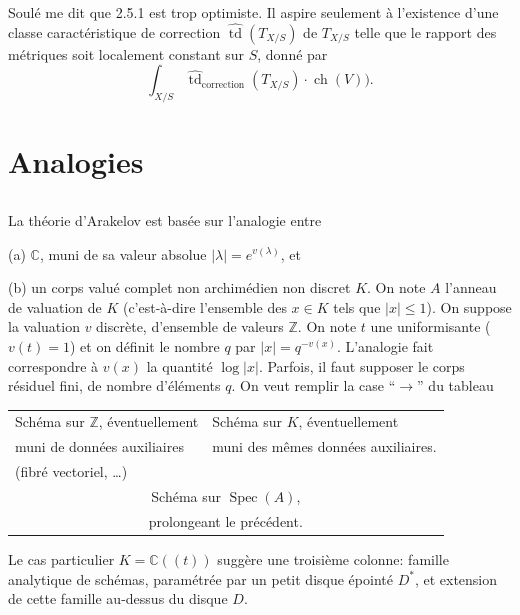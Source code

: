 \documentclass[12pt,a4paper]{article}
\theoremstyle{plain}
\theoremstyle{definition}
\DeclareMathOperator{\ch}{ch}
\DeclareMathOperator{\td}{td}
\DeclareMathOperator{\Spec}{Spec}
\newcommand{\ZZ}{\mathbb{Z}}
\newcommand{\CC}{\mathbb{C}}
\begin{document}
Soul\'e me dit que 2.5.1 est trop optimiste. Il aspire seulement \`a l'existence
d'une classe caract\'eristique de correction $\widehat{\td}(T_{X/S})$ de $T_{X/S}$ telle que le rapport
des m\'etriques soit localement constant sur $S$, donn\'e par
\[
\textstyle \int_{X/S} \widehat{\td}_{\text{correction}}(T_{X/S}) \cdot \ch(V)) .
\]



\section{Analogies}

\subsection{}

La th\'eorie d'Arakelov est bas\'ee sur l'analogie entre

(a) $\CC$, muni de sa valeur absolue $|\lambda| = e^{v(\lambda)}$, et

(b) un corps valu\'e complet non archim\'edien non discret $K$. On note $A$ l'anneau
de valuation de $K$ (c'est-\`a-dire l'ensemble des $x \in K$ tels que $|x| \leq 1$).
On suppose la valuation $v$ discr\`ete, d'ensemble de valeurs $\ZZ$. On note $t$
une uniformisante ($v(t) = 1$) et on d\'efinit le nombre $q$ par $|x| = q^{-v(x)}$.
L'analogie fait correspondre \`a $v(x)$ la quantit\'e $\log |x|$. Parfois, il faut
supposer le corps r\'esiduel fini, de nombre d'\'el\'ements $q$. On veut remplir la
case ``$\to$'' du tableau

\begin{center}
\begin{tabular}{p{6cm}|p{6cm}}
Sch\'ema sur $\ZZ$, \'eventuellement & Sch\'ema sur $K$, \'eventuellement \\
muni de donn\'ees auxiliaires & muni des m\^emes donn\'ees auxiliaires.\\
(fibr\'e vectoriel, \ldots) & \\
\hline
\multicolumn{2}{c}{Sch\'ema sur $\Spec(A)$,} \\
\multicolumn{2}{c}{prolongeant le pr\'ec\'edent.}
\end{tabular}
\end{center}

Le cas particulier $K = \CC((t))$ sugg\`ere une troisi\`eme colonne: famille analytique
de sch\'emas, param\'etr\'ee par un petit disque \'epoint\'e $D^*$, et extension de cette
famille au-dessus du disque $D$.
\end{document}
